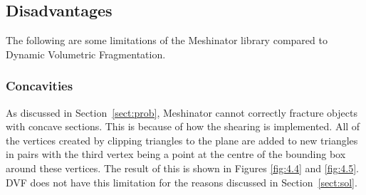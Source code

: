 \subsection{Disadvantages}

The following are some limitations of the Meshinator library compared to Dynamic Volumetric Fragmentation.

\subsubsection{Concavities}

As discussed in Section~\ref{sect:prob}, Meshinator cannot correctly fracture objects with concave sections. This is because of how the shearing is implemented. All of the vertices created by clipping triangles to the plane are added to new triangles in pairs with the third vertex being a point at the centre of the bounding box around these vertices. The result of this is shown in Figures \ref{fig:4.4} and \ref{fig:4.5}. DVF does not have this limitation for the reasons discussed in Section~\ref{sect:sol}.

